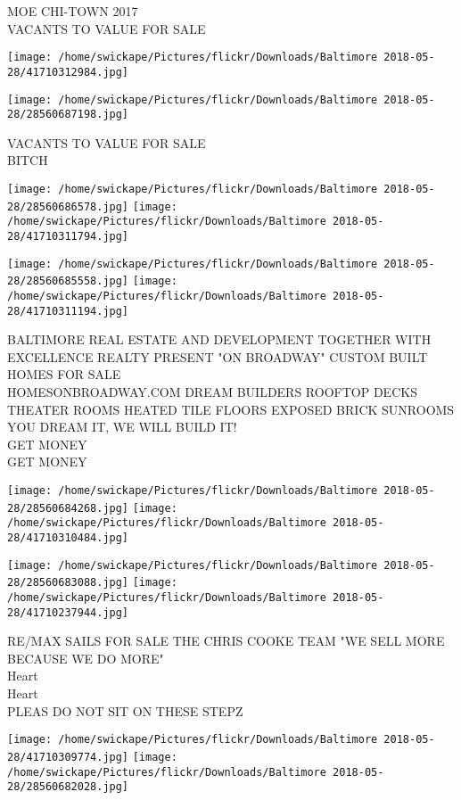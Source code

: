 \documentclass[10pt,letterpaper]{article}
\begin{document}
MOE CHI{-}TOWN 2017\\
VACANTS TO VALUE FOR SALE
\pagebreak

\texttt{[image: /home/swickape/Pictures/flickr/Downloads/Baltimore 2018-05-28/41710312984.jpg]}

\vspace{0.25in}
\texttt{[image: /home/swickape/Pictures/flickr/Downloads/Baltimore 2018-05-28/28560687198.jpg]}

VACANTS TO VALUE FOR SALE\\
BITCH
\pagebreak

\texttt{[image: /home/swickape/Pictures/flickr/Downloads/Baltimore 2018-05-28/28560686578.jpg]}
\texttt{[image: /home/swickape/Pictures/flickr/Downloads/Baltimore 2018-05-28/41710311794.jpg]}

\texttt{[image: /home/swickape/Pictures/flickr/Downloads/Baltimore 2018-05-28/28560685558.jpg]}
\texttt{[image: /home/swickape/Pictures/flickr/Downloads/Baltimore 2018-05-28/41710311194.jpg]}

BALTIMORE REAL ESTATE AND DEVELOPMENT TOGETHER WITH EXCELLENCE REALTY PRESENT "ON BROADWAY" CUSTOM BUILT HOMES FOR SALE\\
HOMESONBROADWAY.COM DREAM BUILDERS ROOFTOP DECKS THEATER ROOMS HEATED TILE FLOORS EXPOSED BRICK SUNROOMS YOU DREAM IT, WE WILL BUILD IT!\\
GET MONEY\\
GET MONEY
\pagebreak

\texttt{[image: /home/swickape/Pictures/flickr/Downloads/Baltimore 2018-05-28/28560684268.jpg]}
\texttt{[image: /home/swickape/Pictures/flickr/Downloads/Baltimore 2018-05-28/41710310484.jpg]}

\texttt{[image: /home/swickape/Pictures/flickr/Downloads/Baltimore 2018-05-28/28560683088.jpg]}
\texttt{[image: /home/swickape/Pictures/flickr/Downloads/Baltimore 2018-05-28/41710237944.jpg]}

RE/MAX SAILS FOR SALE THE CHRIS COOKE TEAM "WE SELL MORE BECAUSE WE DO MORE"\\
Heart\\
Heart\\
PLEAS DO NOT SIT ON THESE STEPZ
\pagebreak

\texttt{[image: /home/swickape/Pictures/flickr/Downloads/Baltimore 2018-05-28/41710309774.jpg]}
\texttt{[image: /home/swickape/Pictures/flickr/Downloads/Baltimore 2018-05-28/28560682028.jpg]}
\end{document}
